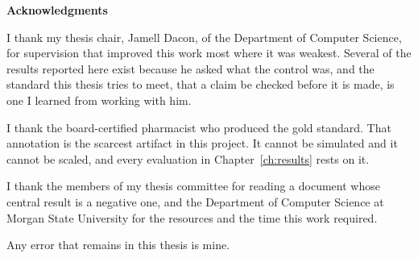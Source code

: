 \begin{frontmatterpage}
  \doublespacing
  {\centering\normalsize\bfseries Acknowledgments\par}\vspace{\baselineskip}
  I thank my thesis chair, Jamell Dacon, of the Department of Computer
  Science, for supervision that improved this work most where it was weakest.
  Several of the results reported here exist because he asked what the control
  was, and the standard this thesis tries to meet, that a claim be checked
  before it is made, is one I learned from working with him.

  I thank the board-certified pharmacist who produced the gold standard. That
  annotation is the scarcest artifact in this project. It cannot be simulated
  and it cannot be scaled, and every evaluation in Chapter~\ref{ch:results}
  rests on it.

  I thank the members of my thesis committee for reading a document whose
  central result is a negative one, and the Department of Computer Science at
  Morgan State University for the resources and the time this work required.

  Any error that remains in this thesis is mine.
\end{frontmatterpage}
